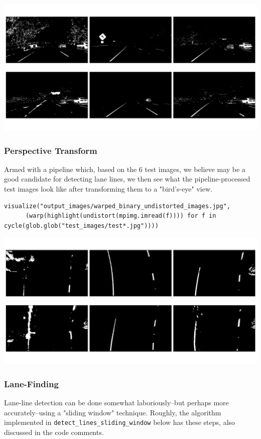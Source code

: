 \documentclass[11pt]{article}
\begin{document}
\includegraphics[width=.9\linewidth]{output_images/binary_undistorted_test_images.jpg}

\subsubsection*{Perspective Transform}
\label{sec-1-2-5}

Armed with a pipeline which, based on the 6 test images, we
believe may be a good candidate for detecting lane lines, we
then see what the pipeline-processed test images look like after
transforming them to a "bird's-eye" view.

\begin{verbatim}
visualize("output_images/warped_binary_undistorted_images.jpg",
	  (warp(highlight(undistort(mpimg.imread(f)))) for f in cycle(glob.glob("test_images/test*.jpg"))))
\end{verbatim}

\includegraphics[width=.9\linewidth]{output_images/warped_binary_undistorted_images.jpg}

\subsubsection*{Lane-Finding}
\label{sec-1-2-6}

Lane-line detection can be done somewhat laboriously--but
perhaps more accurately--using a "sliding window" technique.
Roughly, the algorithm implemented in
\texttt{detect\_lines\_sliding\_window} below has these steps, also
discussed in the code comments.
\end{document}
